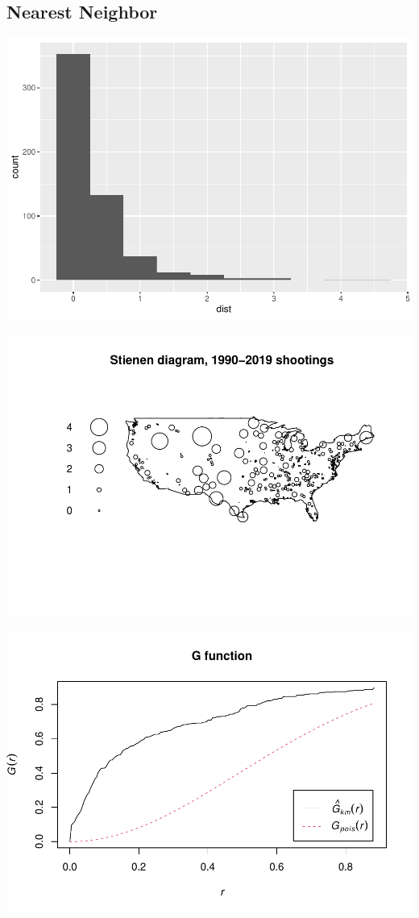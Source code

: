 \documentclass[12pt]{article}
\begin{document}
\hypertarget{nearest-neighbor}{%
\subsection{Nearest Neighbor}\label{nearest-neighbor}}

\includegraphics{JStevenRaquel_STATS295_Final_files/figure-latex/nearest-neighbor-1.pdf}

\includegraphics{JStevenRaquel_STATS295_Final_files/figure-latex/Sienen-diagram-1.pdf}

\includegraphics{JStevenRaquel_STATS295_Final_files/figure-latex/G-function-1.pdf}
\end{document}
